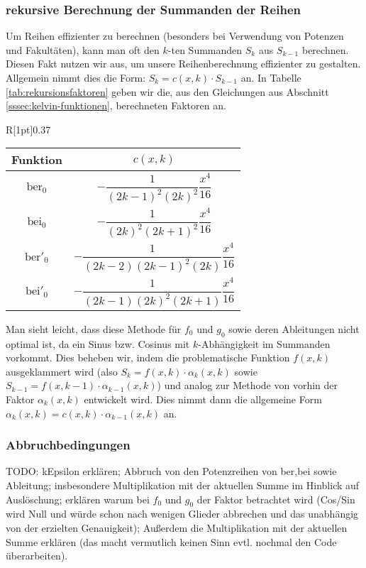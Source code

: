 \documentclass[10pt,a4paper]{article}
\begin{document}
\subsubsection{rekursive Berechnung der Summanden der Reihen}
Um Reihen effizienter zu berechnen (besonders bei Verwendung von Potenzen und Fakultäten), kann man oft den $k$-ten Summanden $S_k$ aus $S_{k-1}$ berechnen. Diesen Fakt nutzen wir aus, um unsere Reihenberechnung effizienter zu gestalten. Allgemein nimmt dies die Form: $S_k = c(x, k)\cdot S_{k-1}$ an.
In Tabelle \ref{tab:rekursionsfaktoren} geben wir die, aus den Gleichungen aus Abschnitt \ref{sssec:kelvin-funktionen}, berechneten Faktoren an.
\begin{wraptable}[13]{R}[1pt]{0.37\textwidth}
\begin{tabular}{c|c}
Funktion & $c(x,k)$ \\\hline
\rule[-3.5ex]{0pt}{8ex} $\mathrm{ber}_0$ & $-\dfrac{1}{(2k-1)^2 (2k)^2}\dfrac{x^4}{16}$ \\ \hline
\rule[-3.5ex]{0pt}{8ex} $\mathrm{bei}_0$ & $-\dfrac{1}{(2k)^2 (2k+1)^2}\dfrac{x^4}{16}$ \\ \hline
\rule[-3.5ex]{0pt}{8ex} $\mathrm{ber}'_0$ & $-\dfrac{1}{(2k-2) (2k-1)^2 (2k)}\dfrac{x^4}{16}$ \\ \hline
\rule[-3.5ex]{0pt}{8ex} $\mathrm{bei}'_0$ & $-\dfrac{1}{(2k-1) (2k)^2 (2k+1)}\dfrac{x^4}{16}$
\end{tabular}
\caption{CAPTION}
\label{tab:rekursionsfaktoren}
\end{wraptable}\newline
Man sieht leicht, dass diese Methode für $f_0$ und $g_0$ sowie deren Ableitungen nicht optimal ist, da ein Sinus bzw. Cosinus mit $k$-Abhängigkeit im Summanden vorkommt.
Dies beheben wir, indem die problematische Funktion $f(x,k)$ ausgeklammert wird (also $S_k = f(x,k) \cdot \alpha_k(x,k)$ sowie $S_{k-1} = f(x,k-1) \cdot \alpha_{k-1}(x,k)$)
und analog zur Methode von vorhin der Faktor $\alpha_k(x,k)$ entwickelt wird. Dies nimmt dann die allgemeine Form $\alpha_k(x,k) = c(x,k)\cdot\alpha_{k-1}(x,k)$ an.
\subsubsection{Abbruchbedingungen}
TODO: kEpsilon erklären; Abbruch von den Potenzreihen von ber,bei sowie Ableitung; insbesondere Multiplikation mit der aktuellen Summe im Hinblick auf Auslöschung; erklären warum bei $f_0$ und $g_0$ der Faktor betrachtet wird (Cos/Sin wird Null und würde schon nach wenigen Glieder abbrechen und das unabhängig von der erzielten Genauigkeit); Außerdem die Multiplikation mit der aktuellen Summe erklären (das macht vermutlich keinen Sinn evtl. nochmal den Code überarbeiten).
\end{document}
